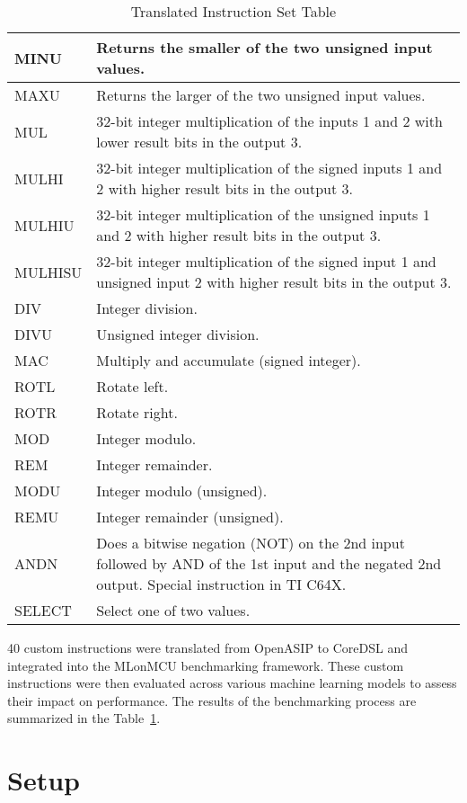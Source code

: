 \begin{table}[!ht]
\begin{tabularx}{\textwidth}{|l|X|}
    MINU & Returns the smaller of the two unsigned input values. \\ \hline
    MAXU & Returns the larger of the two unsigned input values. \\ \hline
    MUL & 32-bit integer multiplication of the inputs 1 and 2 with lower result bits in the output 3. \\ \hline
    MULHI & 32-bit integer multiplication of the signed inputs 1 and 2 with higher result bits in the output 3. \\ \hline
    MULHIU & 32-bit integer multiplication of the unsigned inputs 1 and 2 with higher result bits in the output 3. \\ \hline
    MULHISU & 32-bit integer multiplication of the signed input 1 and unsigned input 2 with higher result bits in the output 3. \\ \hline
    DIV & Integer division. \\ \hline
    DIVU & Unsigned integer division. \\ \hline
    MAC & Multiply and accumulate (signed integer). \\ \hline
    ROTL & Rotate left. \\ \hline
    ROTR & Rotate right. \\ \hline
    MOD & Integer modulo. \\ \hline
    REM & Integer remainder. \\ \hline
    MODU & Integer modulo (unsigned). \\ \hline
    REMU & Integer remainder (unsigned). \\ \hline
    ANDN & Does a bitwise negation (NOT) on the 2nd input followed by AND of the 1st input and the negated 2nd output. Special instruction in TI C64X. \\ \hline
    SELECT & Select one of two values. \\ \hline
    \end{tabularx}
    \caption{Translated Instruction Set Table}
    \label{tab:translated_instructions}
\end{table}

40 custom instructions were translated from OpenASIP to CoreDSL and integrated into the MLonMCU benchmarking framework. These custom instructions were then evaluated across various machine learning models to assess their impact on performance. The results of the benchmarking process are summarized in the Table~\ref{tab:translated_instructions}.

\section{Setup}

